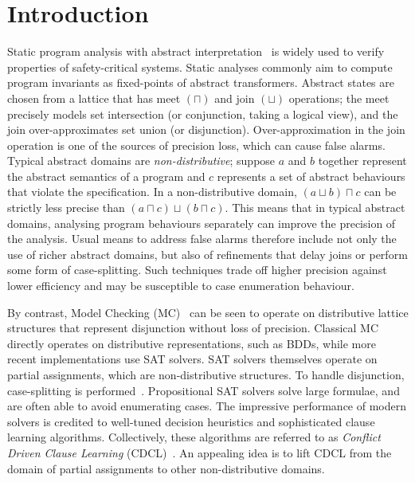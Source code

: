 \section{Introduction}

%
Static program analysis with abstract interpretation~\cite{CC77} is widely
used to verify properties of safety-critical systems.  Static analyses
commonly aim to compute program invariants as fixed-points of abstract
transformers.  Abstract states are chosen from a lattice that has meet
$(\sqcap)$ and join $(\sqcup)$ operations; the meet precisely models set
intersection (or conjunction, taking a logical view), and the join
over-approximates set union (or disjunction).  Over-approximation in the
join operation is one of the sources of precision loss, which can cause false
alarms.  Typical abstract domains are \textit{non-distributive}; suppose $a$ and $b$
together represent the abstract semantics of a program and $c$ represents a
set of abstract behaviours that violate the specification.  In a
non-distributive domain, $(a \sqcup b) \sqcap c$ can be strictly less
precise than $(a \sqcap c) \sqcup (b \sqcap c)$.  This means that in typical
abstract domains, analysing program behaviours separately can improve the
precision of the analysis.  Usual means to address false alarms therefore
include not only the use of richer abstract domains, but also of refinements
that delay joins or perform some form of case-splitting.  Such techniques
trade off higher precision against lower efficiency and may be susceptible
to case enumeration behaviour.

By contrast, Model Checking (MC)~\cite{mc-book} can be seen to operate on
distributive lattice structures that represent disjunction without loss
of precision.  Classical MC directly operates on distributive
representations, such as BDDs, while more recent implementations use SAT
solvers.  SAT solvers themselves operate on partial assignments, which are
non-distributive structures.  To handle disjunction, case-splitting is
performed~\cite{sas12}.  Propositional SAT solvers solve large formulae, and
are often able to avoid enumerating cases.  The impressive performance of
modern solvers is credited to well-tuned decision heuristics and
sophisticated clause learning algorithms.  Collectively, these algorithms
are referred to as \emph{Conflict Driven Clause Learning}
(CDCL)~\cite{cdcl}.  An appealing idea is to lift CDCL from the domain of 
partial assignments to other non-distributive domains.

